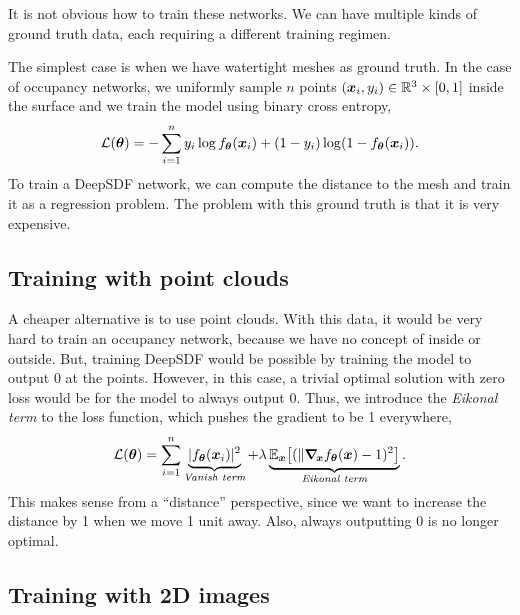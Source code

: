 It is not obvious how to train these networks. We can have multiple kinds of ground truth data,
each requiring a different training regimen.

The simplest case is when we have watertight meshes as ground truth. In the case of
occupancy networks, we uniformly sample $n$ points $(\bm{x}_i, y_i) \in \mathbb{R}^3 \times [0,1]$ inside
the surface and we train the model using binary cross entropy, \[
    \mathcal{L}(\vec{\theta}) = - \sum_{i=1}^{n} y_i \log f_{\vec{\theta}}\lft(\vec{x}_i\rgt) + \lft(1-y_i\rgt) \log \lft(1-f_{\vec{\theta}}\lft(\vec{x}_i\rgt)\rgt).
\]
To train a DeepSDF network, we can compute the distance to the mesh and train it as a regression
problem. The problem with this ground truth is that it is very expensive.

\subsection{Training with point clouds}


A cheaper alternative is to use point clouds. With this data, it would be very hard to train an
occupancy network, because we have no concept of inside or outside. But, training DeepSDF would be
possible by training the model to output 0 at the points. However, in this case, a trivial optimal
solution with zero loss would be for the model to always output 0. Thus, we introduce the
\textit{Eikonal term} \citep{gropp2020implicit} to the loss function, which pushes the gradient to
be 1 everywhere, \[
    \mathcal{L}(\vec{\theta}) = \sum_{i=1}^{n} \underbrace{|f_{\vec{\theta}}(\vec{x}_i)|^2}_{\textit{Vanish term}} + \lambda \underbrace{\E_{\vec{x}}\lft[(\| \grad{f_{\vec{\theta}}(\vec{x})}{\vec{x}} - 1)^2\rgt]}_{\textit{Eikonal term}}.
\]
This makes sense from a ``distance'' perspective, since we want to increase the distance by 1 when
we move 1 unit away. Also, always outputting 0 is no longer optimal.

\subsection{Training with 2D images}

